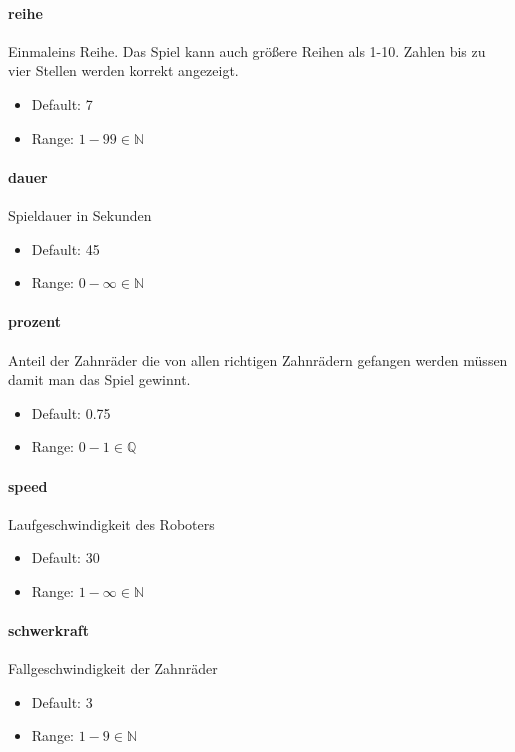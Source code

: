 \documentclass[]{article}
\begin{document}
\begin{multicols}{2}

	\paragraph{reihe}  Einmaleins Reihe. Das Spiel kann auch größere Reihen als 1-10. Zahlen bis zu vier Stellen werden korrekt angezeigt.
	\begin{itemize}
		\item Default: 7
		\item Range: $1-99 \in \mathbb{N} $
	\end{itemize}

	\paragraph{dauer}  Spieldauer in Sekunden
	\begin{itemize}
		\item Default: 45
		\item Range: $ 0 - \infty \in \mathbb{N}$
	\end{itemize}
	\paragraph{prozent} Anteil der Zahnräder die von allen richtigen Zahnrädern gefangen werden müssen damit man das Spiel gewinnt.
	\begin{itemize}
		\item Default: 0.75
		\item Range: $ 0 - 1 \in \mathbb{Q}$
	\end{itemize}
	\paragraph{speed}  Laufgeschwindigkeit des Roboters
	\begin{itemize}
		\item Default: 30
		\item Range: $ 1 - \infty \in \mathbb{N}$
	\end{itemize}
	\paragraph{schwerkraft}  Fallgeschwindigkeit der Zahnräder
	\begin{itemize}
		\item Default: 3
		\item Range: $ \displaystyle 1 - 9 \in \mathbb{N}$
	\end{itemize}

\end{multicols}
\end{document}
